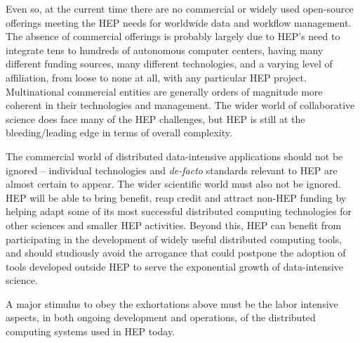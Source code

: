 Even so, at the current time there are no commercial or widely used open-source 
offerings meeting the HEP needs for worldwide data and workflow management.  
The absence of commercial offerings is probably largely due to HEP's need to 
integrate tens to hundreds of autonomous computer centers, having many different 
funding sources, many different technologies, and a varying level of affiliation, 
from loose to none at all, with any particular HEP project.  Multinational commercial 
entities are generally orders of magnitude more coherent in their technologies and 
management.  The wider world of collaborative science does face many of the HEP 
challenges, but HEP is still at the bleeding/leading edge in terms of overall 
complexity.

The commercial world of distributed data-intensive applications should not be 
ignored -- individual technologies and {\it de-facto} standards relevant to HEP are 
almost certain to appear.  The wider scientific world must also not be ignored.  
HEP will be able to bring benefit, reap credit and attract non-HEP funding by 
helping adapt some of its most successful distributed computing technologies 
for other sciences and smaller HEP activities. Beyond this, HEP can benefit 
from participating in the development of widely useful distributed computing 
tools, and should studiously avoid the arrogance that could postpone the adoption 
of tools developed outside HEP to serve the exponential growth of data-intensive science.

A major stimulus to obey the exhortations above must be the labor intensive aspects, 
in both ongoing development and operations, of the distributed computing systems 
used in HEP today.

